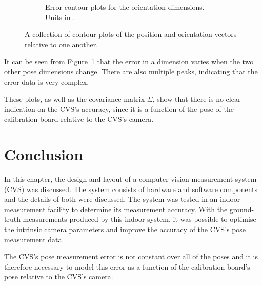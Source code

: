 \begin{figure}
\begin{subfigure}{0.48\textwidth}
\begin{subfigure}{\textwidth}
    \end{subfigure}
    \caption{Error contour plots for the orientation dimensions. Units in \textdegree.}
  \end{subfigure}
  \caption[A collection of contour plots of the position and orientation vectors relative to one another]{A collection of contour plots of the position and orientation vectors relative to one another.}
  \label{fig:err-contour}
\end{figure}

It can be seen from Figure~\ref{fig:err-contour} that the error in a dimension varies when the two other pose dimensions change. There are also multiple peaks, indicating that the error data is very complex. 

These plots, as well as the covariance matrix $\Sigma$, show that there is no clear indication on the CVS's accuracy, since it is a function of the pose of the calibration board relative to the CVS's camera. 

\section{Conclusion}

In this chapter, the design and layout of a computer vision measurement system (CVS) was discussed. The system consists of hardware and software components and the details of both were discussed. The system was tested in an indoor measurement facility to determine its measurement accuracy. With the ground-truth measurements produced by this indoor system, it was possible to optimise the intrinsic camera parameters and improve the accuracy of the CVS's pose measurement data.

The CVS's pose measurement error is not constant over all of the poses and it is therefore necessary to model this error as a function of the calibration board's pose relative to the CVS's camera. 
